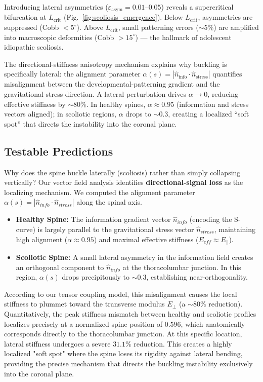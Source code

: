 Introducing lateral asymmetries ($\varepsilon_{\mathrm{asym}} = 0.01$--$0.05$) reveals a supercritical bifurcation at $L_{\mathrm{crit}}$ (Fig.~\ref{fig:scoliosis_emergence}). Below $L_{\mathrm{crit}}$, asymmetries are suppressed (Cobb $< 5^\circ$). Above $L_{\mathrm{crit}}$, small patterning errors (${\sim}5\%$) are amplified into macroscopic deformities (Cobb $> 15^\circ$) --- the hallmark of adolescent idiopathic scoliosis.

The directional-stiffness anisotropy mechanism explains why buckling is specifically lateral: the alignment parameter $\alpha(s) = |\hat{n}_{\mathrm{info}} \cdot \hat{n}_{\mathrm{stress}}|$ quantifies misalignment between the developmental-patterning gradient and the gravitational-stress direction. A lateral perturbation drives $\alpha \to 0$, reducing effective stiffness by ${\sim}80\%$. In healthy spines, $\alpha \approx 0.95$ (information and stress vectors aligned); in scoliotic regions, $\alpha$ drops to ${\sim}0.3$, creating a localized ``soft spot'' that directs the instability into the coronal plane.

\subsection{Testable Predictions}
Why does the spine buckle laterally (scoliosis) rather than simply collapsing vertically? Our vector field analysis identifies \textbf{directional-signal loss} as the localizing mechanism.
We computed the alignment parameter $\alpha(s) = |\hat{n}_{info} \cdot \hat{n}_{stress}|$ along the spinal axis.
\begin{itemize}
    \item \textbf{Healthy Spine:} The information gradient vector $\hat{n}_{info}$ (encoding the S-curve) is largely parallel to the gravitational stress vector $\hat{n}_{stress}$, maintaining high alignment ($\alpha \approx 0.95$) and maximal effective stiffness ($E_{eff} \approx E_{\parallel}$).
    \item \textbf{Scoliotic Spine:} A small lateral asymmetry in the information field creates an orthogonal component to $\hat{n}_{info}$ at the thoracolumbar junction. In this region, $\alpha(s)$ drops precipitously to $\sim 0.3$, establishing near-orthogonality.
\end{itemize}
According to our tensor coupling model, this misalignment causes the local stiffness to plummet toward the transverse modulus $E_{\perp}$ (a $\sim 80\%$ reduction). Quantitatively, the peak stiffness mismatch between healthy and scoliotic profiles localizes precisely at a normalized spine position of $0.596$, which anatomically corresponds directly to the thoracolumbar junction. At this specific location, lateral stiffness undergoes a severe $31.1\%$ reduction. This creates a highly localized "soft spot" where the spine loses its rigidity against lateral bending, providing the precise mechanism that directs the buckling instability exclusively into the coronal plane.

